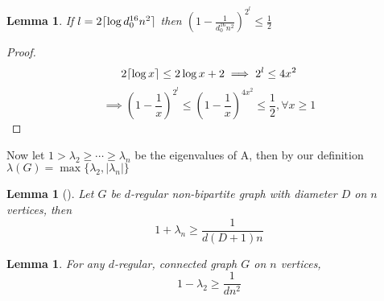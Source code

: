 \documentclass[10pt]{article}
\theoremstyle{plain}
\newtheorem{lemma}[theorem]{Lemma}
\theoremstyle{definition}
\DeclarePairedDelimiter\ceil{\lceil}{\rceil}
\begin{document}
\begin{lemma}
If $l = 2\ceil{\log d_0^{16}n^2}$ then $\left(1 - \frac{1}{d_0^{16}n^2}\right)^{2^l} \leq \frac12$
\end{lemma}

\begin{proof}
$$2\ceil{\log x} \leq 2\log x + 2 \implies 2^l \leq 4x^2$$
$$\implies \left(1 - \frac{1}{x}\right)^{2^l} \leq \left(1 - \frac{1}{x}\right)^{4x^2} \leq \frac12, \forall x \geq 1$$
\end{proof}

Now let $1 > \lambda_2 \geq \cdots \geq \lambda_n$ be the eigenvalues of $\mathrm{A}$, then by our definition $\lambda(G) = \max \{\lambda_2, |\lambda_n|\}$

\begin{lemma}[\cite{DBLP:journals/cpc/AlonS00}]
Let $G$ be $d$-regular non-bipartite graph with diameter $D$ on $n$ vertices, then
$$1 + \lambda_n \geq \frac{1}{d(D+1)n}$$
\end{lemma}

\begin{lemma}
For any $d$-regular, connected graph $G$ on $n$ vertices, $$1 - \lambda_2 \geq\frac{1}{dn^2}$$
\end{lemma}
\end{document}

